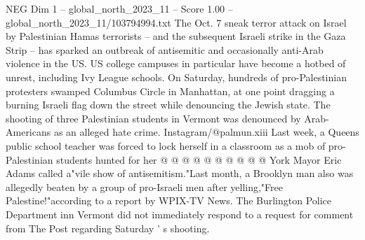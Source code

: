 \begin{textsample}{NEG Dim 1 – global\_north\_2023\_11 – Score 1.00 – global\_north\_2023\_11/103794994.txt}
The Oct. 7 sneak terror attack on Israel by Palestinian Hamas terrorists -- and the subsequent Israeli strike in the Gaza Strip -- has sparked an outbreak of antisemitic and occasionally anti-Arab violence in the US.
US college campuses in particular have become a hotbed of unrest, including Ivy League schools.
On Saturday, hundreds of pro-Palestinian protesters swamped Columbus Circle in Manhattan, at one point dragging a burning Israeli flag down the street while denouncing the Jewish state.
The shooting of three Palestinian students in Vermont was denounced by Arab-Americans as an alleged hate crime.
Instagram/@palmun.xiii Last week, a Queens public school teacher was forced to lock herself in a classroom as a mob of pro-Palestinian students hunted for her @ @ @ @ @ @ @ @ @ @ York Mayor Eric Adams called a"vile show of antisemitism."Last month, a Brooklyn man also was allegedly beaten by a group of pro-Israeli men after yelling,"Free Palestine!"according to a report by WPIX-TV News.
The Burlington Police Department inn Vermont did not immediately respond to a request for comment from The Post regarding Saturday ' s shooting.

\end{textsample}
